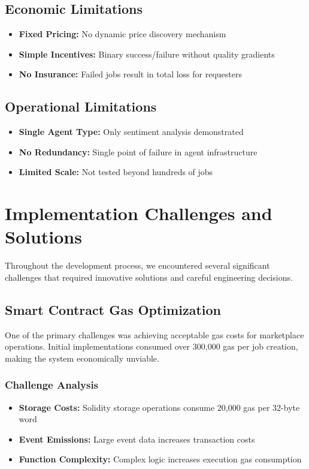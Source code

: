 \subsection{Economic Limitations}
\begin{itemize}
    \item \textbf{Fixed Pricing:} No dynamic price discovery mechanism
    \item \textbf{Simple Incentives:} Binary success/failure without quality gradients
    \item \textbf{No Insurance:} Failed jobs result in total loss for requesters
\end{itemize}

\subsection{Operational Limitations}
\begin{itemize}
    \item \textbf{Single Agent Type:} Only sentiment analysis demonstrated
    \item \textbf{No Redundancy:} Single point of failure in agent infrastructure
    \item \textbf{Limited Scale:} Not tested beyond hundreds of jobs
\end{itemize}

\section{Implementation Challenges and Solutions}

Throughout the development process, we encountered several significant challenges that required innovative solutions and careful engineering decisions.

\subsection{Smart Contract Gas Optimization}

One of the primary challenges was achieving acceptable gas costs for marketplace operations. Initial implementations consumed over 300,000 gas per job creation, making the system economically unviable.

\subsubsection{Challenge Analysis}
\begin{itemize}
    \item \textbf{Storage Costs:} Solidity storage operations consume 20,000 gas per 32-byte word
    \item \textbf{Event Emissions:} Large event data increases transaction costs
    \item \textbf{Function Complexity:} Complex logic increases execution gas consumption
\end{itemize}

